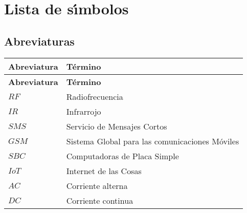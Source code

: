 \chapter*{Lista de s\'{\i}mbolos}

\section*{Abreviaturas}
\begin{longtable}[l]{>{}l<{}l}
  \textbf{Abreviatura} & \textbf{T\'{e}rmino} \\[0.5ex] \hline%
  \endfirsthead%
  \textbf{Abreviatura} & \textbf{T\'{e}rmino} \\[0.5ex] \hline%
  \endhead%
\renewcommand{\arraystretch}{1.4}\label{simbolosg}
 $RF$	 &Radiofrecuencia\\%
 $IR$    &Infrarrojo\\%
 $SMS$   &Servicio de Mensajes Cortos\\%
 $GSM$   &Sistema Global para las comunicaciones Móviles\\%
 $SBC$   &Computadoras de Placa Simple\\%
 $IoT$   &Internet de las Cosas\\%
 $AC$    &Corriente alterna\\%
 $DC$    &Corriente continua\\%

\end{longtable}


\setlength{\extrarowheight}{0pt}